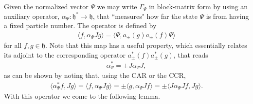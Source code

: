 Given the normalized vector $\Psi$ we may write
$\Gamma_\Psi$ in block-matrix form by using an auxiliary operator,
$\alpha_\Psi : \mathfrak{h}^* \to \mathfrak{h}$, that ``measures" how far the state $\Psi$ is
from having a fixed particle number. The operator is defined by
\begin{align*}
	\langle f,\alpha_\Psi Jg\rangle = \langle\Psi,a_\pm(g)a_\pm(f)\Psi\rangle
\end{align*}
for all $f,g\in\mathfrak{h}$. Note that this map has a useful property, which essentially
relates its adjoint to the corresponding operator $a^*_\pm(f)a^*_\pm(g)$, that reads
\begin{align*}
	\alpha_\Psi^* = \pm J \alpha_\Psi J,
\end{align*}
as can be shown by noting that, using the CAR or the CCR,
\begin{align*}
	\langle\alpha_\Psi^* f,Jg\rangle = \langle f,\alpha_\Psi Jg\rangle
	= \pm \langle g,\alpha_\Psi Jf\rangle = \pm \langle J\alpha_\Psi Jf, Jg\rangle.
\end{align*}
With this operator we come to the following lemma.

